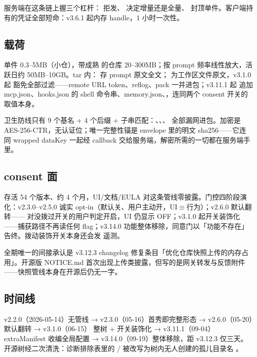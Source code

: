 服务端在这条链上握三个杠杆： 拒发、 决定增量还是全量、 封顶单件。客户端持有的凭证全部短命：v3.6.1 起内存 handle，1 小时一次性。

\subsection{载荷}

单件 0.3–5MB（小仓），带成熟  的仓库 20–300MB；按 prompt 频率线性放大，活跃日约 50MB–10GB。tar 内： 存 prompt 原文全文； 为工作区文件原文，v3.1.0 起  豁免全部过滤——remote URL token、reflog、pack 一并进包；v3.11.1 起  追加 mcp.json、hooks.json 的 shell 命令串、memory.json、，连同两个 consent 开关的取值本身。

卫生防线只有 9 个基名 + 4 个后缀 +  子串匹配：、、、 全部漏网进包。加密是 AES-256-CTR，无认证位；唯一完整性锚是 envelope 里的明文 sha256——它连同 wrapped dataKey 一起经 callback 交给服务端，解密所需的一切都在服务端手里。

\subsection{consent 面}

存活 54 个版本、约 4 个月，UI/文档/EULA 对这条管线零披露。门控四阶段演化：v2.3.0–v2.5.0 诚实 opt-in（默认关、用户主动开，UI$\equiv$行为）；v2.6.0 默认翻转—— 对没拨过开关的用户判定开启，UI 仍显示 OFF；v3.1.0 起开关装饰化——捕获路径不再读任何 flag；v3.14.0 功能整体移除，同意门以「功能不存在」告终。拨动装饰开关本身还会发  遥测。

全期唯一的间接承认是 v3.12.3 changelog 修复条目「优化仓库快照上传的内存占用」。开源版 NOTICE.md 首次出现上传类披露，但写的是网关转发与反馈附件——快照管线本身在开源后仍无一字。

\subsection{时间线}

v2.2.0（2026-05-14）无管线 → v2.3.0（05-16）首秀即完整形态 → v2.6.0（05-20）默认翻转 → v3.1.0（06-15） 整树 + 开关装饰化 → v3.11.1（09-04）extraManifest 收编全局配置 → v3.14.0（09-19）整体移除，距 v3.12.3 仅三天。开源树经二次清洗：诊断排除表里的 / 被改写为树内无人创建的孤儿目录名 。

